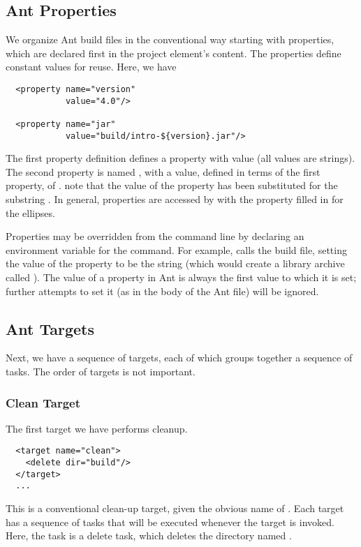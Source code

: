 \subsection{Ant Properties}\label{section:intro-ant-properties}

We organize Ant build files in the conventional way starting with
properties, which are declared first in the project element's content.
The properties define constant values for reuse.  Here, we have
%
\begin{verbatim}
  <property name="version"
            value="4.0"/>

  <property name="jar"
            value="build/intro-${version}.jar"/>
\end{verbatim}
%
The first property definition defines a property  with
value  (all values are strings).  The second property is
named , with a value, defined in terms of the first property,
of .  note that the value of the
property  has been substituted for the substring .
In general, properties are accessed by
 with the property filled in for the ellipses.

Properties may be overridden from the command line by declaring
an environment variable for the command.  For example,
%
%
calls the build file, setting the value of the 
property to be the string  (which would create a library
archive called ).  The value of a property in Ant is
always the first value to which it is set; further attempts to set it
(as in the body of the Ant file) will be ignored.


\subsection{Ant Targets}

Next, we have a sequence of targets, each of which groups together
a sequence of tasks.  The order of targets is not important.  

\subsubsection{Clean Target}

The first target we have performs cleanup.
%
\begin{verbatim}
  <target name="clean">
    <delete dir="build"/>
  </target>
  ...
\end{verbatim}
%
This is a conventional clean-up target, given the obvious name of
.  Each target has a sequence of tasks that will be
executed whenever the target is invoked.  Here, the task
is a delete task, which deletes the directory named .

